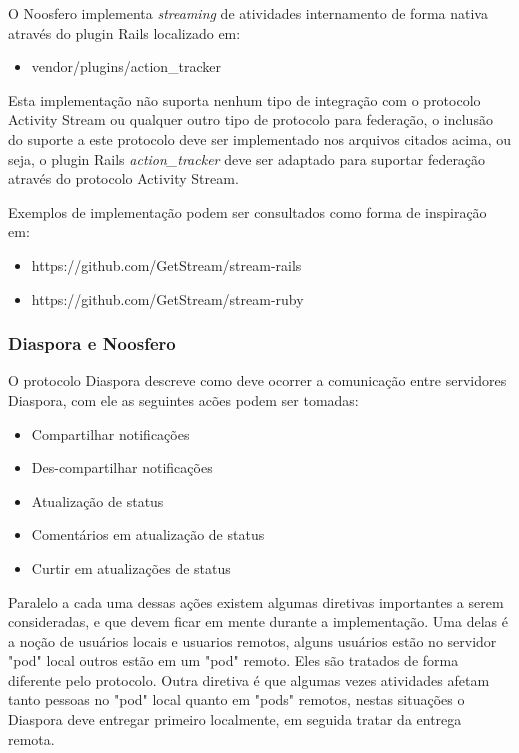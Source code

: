 \documentclass[12pt]{article}
\begin{document}
O Noosfero implementa {\it streaming} de atividades internamento de forma
nativa através do plugin Rails localizado em:

\begin{itemize}
  \item vendor/plugins/action\_tracker
\end{itemize}

Esta implementação não suporta nenhum tipo de integração com o protocolo
Activity Stream ou qualquer outro tipo de protocolo para federação, o inclusão
do suporte a este protocolo deve ser implementado nos arquivos citados acima,
ou seja, o plugin Rails {\it action\_tracker} deve ser adaptado para suportar
federação através do protocolo Activity Stream.

Exemplos de implementação podem ser consultados como forma de inspiração em:

\begin{itemize}
  \item https://github.com/GetStream/stream-rails
  \item https://github.com/GetStream/stream-ruby
\end{itemize}

\subsubsection{Diaspora e Noosfero}

O protocolo Diaspora descreve como deve ocorrer a comunicação entre servidores
Diaspora, com ele as seguintes acões podem ser tomadas:

\begin{itemize}
  \item Compartilhar notificações
  \item Des-compartilhar notificações
  \item Atualização de status
  \item Comentários em atualização de status
  \item Curtir em atualizações de status
\end{itemize}

Paralelo a cada uma dessas ações existem algumas diretivas importantes a serem
consideradas, e que devem ficar em mente durante a implementação. Uma delas é
a noção de usuários locais e usuarios remotos, alguns usuários estão no
servidor "pod" local outros estão em um "pod" remoto. Eles são tratados de
forma diferente pelo protocolo. Outra diretiva é que algumas vezes atividades
afetam tanto pessoas no "pod" local quanto em "pods" remotos, nestas situações
o Diaspora deve entregar primeiro localmente, em seguida tratar da entrega
remota.
\end{document}
